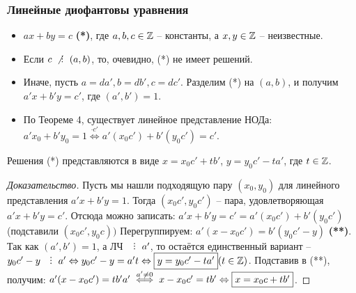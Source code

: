 

\begin{frame}[t]
    \frametitle{\normalsize \bf Линейные диофантовы уравнения}
    \begin{itemize}
        \item $ax + by = c$ \textbf{(*)}, где  $a,b,c \in \mathbb{Z}$ -- константы, а $x, y \in \mathbb{Z}$ -- неизвестные.
        \item Если $c \nDiv \left( a,b \right)$, то, очевидно, (*) не имеет решений.
        \item Иначе, пусть $a = da', b = db', c = dc'$. Разделим (*) на $\left( a,b \right)$, и получим $a'x + b'y = c'$, где $\left( a',b' \right) = 1$.
        \item По Теореме 4, существует линейное представление НОДа: $a'x_0 + b'y_0 = 1 \overset{\cdot c'} \Leftrightarrow a'(x_0c') + b'(y_0c') = c'$. 
    \end{itemize}

\end{frame}

\begin{frame}[t]
    \setcounter{theorem}{9}
    \begin{theorem}
        Решения (*) представляются в виде $x = x_0c' + tb'$, $y = y_0c' - ta'$, где $t \in \mathbb{Z}$.
    \end{theorem}
    
    \begin{proof}[Доказательство]
        Пусть мы нашли подходящую пару $\left( x_0, y_0 \right) $ для линейного представления $a'x + b'y = 1$. Тогда $\left( x_0c', y_0c' \right) $ -- пара, удовлетворяющая $a'x + b'y = c'$. Отсюда можно записать: $a'x + b'y = c' = a'(x_0c') + b'(y_0c') $ (подставили $\left( x_0c', y_0c \right)) $ Перегруппируем: $a'(x - x_0c') = b'(y_0c' - y)$ \textbf{(**)}. Так как $\left( a',b' \right) = 1$, а ЛЧ $\Div a'$, то остаётся единственный вариант --  $y_0c' - y \Div a' \Leftrightarrow y_0c' - y = a't \Leftrightarrow \fbox{$y = y_0c' - ta'$} (t \in \Z)$. Подставив в (**), получим: $a'(x - x_0c') = tb'a' \overset{a' \neq 0} \iff x - x_0c' = tb' \Leftrightarrow \fbox{$x = x_0c + tb'$}$.
    \end{proof}
    
\end{frame}



